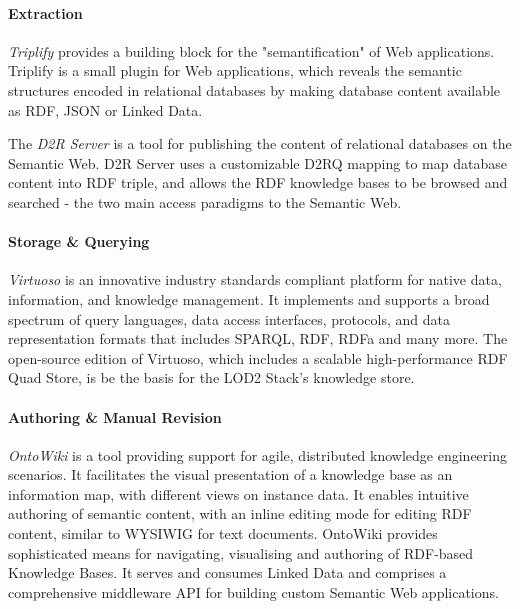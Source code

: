 \documentclass[a4paper, 11pt]{llncs}
\begin{document}
\paragraph{Extraction}

\emph{Triplify} \cite{triplify_www} provides a building block for the "semantification" of Web applications.
Triplify is a small plugin for Web applications, which reveals the semantic structures encoded in relational databases by making database content available as RDF, JSON or Linked Data.

The \emph{D2R Server} \cite{d2rposter} is a tool for publishing the content of relational databases on the Semantic Web.
D2R Server uses a customizable D2RQ mapping to map database content into RDF triple, and allows the RDF knowledge bases to be browsed and searched - the two main access paradigms to the Semantic Web.

\paragraph{Storage \& Querying}

\emph{Virtuoso} \cite{virtuoso} is an innovative industry standards compliant platform for native data, information, and knowledge management.
It implements and supports a broad spectrum of query languages, data access interfaces, protocols, and data representation formats that includes SPARQL, RDF, RDFa and many more.
The open-source edition of Virtuoso, which includes a scalable high-performance RDF Quad Store, is be the basis for the LOD2 Stack's knowledge store.

\paragraph{Authoring \& Manual Revision}

\emph{OntoWiki} \cite{auer-s-2006-736-a} is a tool providing support for agile, distributed knowledge engineering scenarios.
It facilitates the visual presentation of a knowledge base as an information map, with different views on instance data.
It enables intuitive authoring of semantic content, with an inline editing mode for editing RDF content, similar to WYSIWIG for text documents.
OntoWiki provides sophisticated means for navigating, visualising and authoring of RDF-based Knowledge Bases.
It serves and consumes Linked Data and comprises a comprehensive middleware API for building custom Semantic Web applications.
\end{document}
